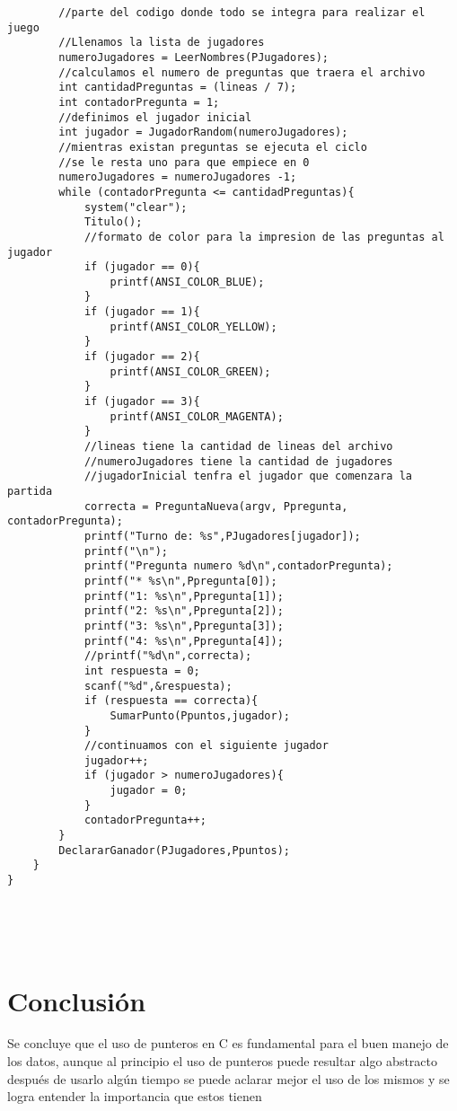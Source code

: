 \begin{verbatim}
        //parte del codigo donde todo se integra para realizar el juego
        //Llenamos la lista de jugadores
        numeroJugadores = LeerNombres(PJugadores);
        //calculamos el numero de preguntas que traera el archivo
        int cantidadPreguntas = (lineas / 7);
        int contadorPregunta = 1;
        //definimos el jugador inicial
        int jugador = JugadorRandom(numeroJugadores);
        //mientras existan preguntas se ejecuta el ciclo
        //se le resta uno para que empiece en 0
        numeroJugadores = numeroJugadores -1;
        while (contadorPregunta <= cantidadPreguntas){
            system("clear");
            Titulo();
            //formato de color para la impresion de las preguntas al jugador
            if (jugador == 0){
                printf(ANSI_COLOR_BLUE);
            }
            if (jugador == 1){
                printf(ANSI_COLOR_YELLOW);
            }
            if (jugador == 2){
                printf(ANSI_COLOR_GREEN);
            }
            if (jugador == 3){
                printf(ANSI_COLOR_MAGENTA);
            }
            //lineas tiene la cantidad de lineas del archivo
            //numeroJugadores tiene la cantidad de jugadores 
            //jugadorInicial tenfra el jugador que comenzara la partida
            correcta = PreguntaNueva(argv, Ppregunta, contadorPregunta);
            printf("Turno de: %s",PJugadores[jugador]);
            printf("\n");
            printf("Pregunta numero %d\n",contadorPregunta);
            printf("* %s\n",Ppregunta[0]);
            printf("1: %s\n",Ppregunta[1]);
            printf("2: %s\n",Ppregunta[2]);
            printf("3: %s\n",Ppregunta[3]);
            printf("4: %s\n",Ppregunta[4]);
            //printf("%d\n",correcta);
            int respuesta = 0;
            scanf("%d",&respuesta);
            if (respuesta == correcta){
                SumarPunto(Ppuntos,jugador);
            }
            //continuamos con el siguiente jugador
            jugador++;
            if (jugador > numeroJugadores){
                jugador = 0;
            }
            contadorPregunta++;
        }
        DeclararGanador(PJugadores,Ppuntos);    
    }
}





\end{verbatim}  


%



\newpage	
\section{Conclusión}
Se concluye que el uso de punteros en C es fundamental para el buen manejo de los datos, aunque al principio el uso de punteros puede resultar algo abstracto después de usarlo algún tiempo se puede aclarar mejor el uso de los mismos y se logra entender la importancia que estos tienen


